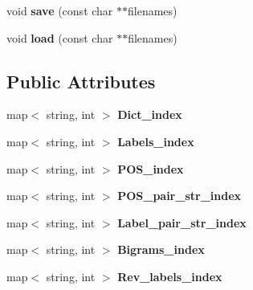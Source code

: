 \begin{DoxyCompactItemize}
\item 
\hypertarget{classFeatureset_a1022c8e9ef550cb2fd201d7b451add49}{
void {\bfseries save} (const char $\ast$$\ast$filenames)}
\label{classFeatureset_a1022c8e9ef550cb2fd201d7b451add49}

\item 
\hypertarget{classFeatureset_aee477e63977c79e3401ce96dbb1ca7a0}{
void {\bfseries load} (const char $\ast$$\ast$filenames)}
\label{classFeatureset_aee477e63977c79e3401ce96dbb1ca7a0}

\end{DoxyCompactItemize}
\subsection*{Public Attributes}
\begin{DoxyCompactItemize}
\item 
\hypertarget{classFeatureset_a895115641f4198ce62ab45c367974caf}{
map$<$ string, int $>$ {\bfseries Dict\_\-index}}
\label{classFeatureset_a895115641f4198ce62ab45c367974caf}

\item 
\hypertarget{classFeatureset_a28fe34af4925977f4763d215c0b31b4e}{
map$<$ string, int $>$ {\bfseries Labels\_\-index}}
\label{classFeatureset_a28fe34af4925977f4763d215c0b31b4e}

\item 
\hypertarget{classFeatureset_ad9d3b6c3ab7b5899eacde3425065b728}{
map$<$ string, int $>$ {\bfseries POS\_\-index}}
\label{classFeatureset_ad9d3b6c3ab7b5899eacde3425065b728}

\item 
\hypertarget{classFeatureset_aeb1d9b93e76f8adb1436b3a47d36c3bf}{
map$<$ string, int $>$ {\bfseries POS\_\-pair\_\-str\_\-index}}
\label{classFeatureset_aeb1d9b93e76f8adb1436b3a47d36c3bf}

\item 
\hypertarget{classFeatureset_a313fff2c94d5121047d695e4a8dec2fc}{
map$<$ string, int $>$ {\bfseries Label\_\-pair\_\-str\_\-index}}
\label{classFeatureset_a313fff2c94d5121047d695e4a8dec2fc}

\item 
\hypertarget{classFeatureset_a34c056e99b1d42db9e03adae70b268a3}{
map$<$ string, int $>$ {\bfseries Bigrams\_\-index}}
\label{classFeatureset_a34c056e99b1d42db9e03adae70b268a3}

\item 
\hypertarget{classFeatureset_a438089f0b7c3462bd9055b8105c95862}{
map$<$ string, int $>$ {\bfseries Rev\_\-labels\_\-index}}
\label{classFeatureset_a438089f0b7c3462bd9055b8105c95862}


\end{DoxyCompactItemize}
